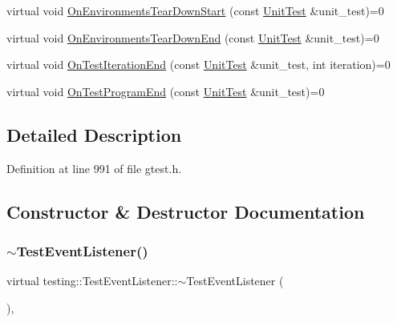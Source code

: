 \begin{DoxyCompactItemize}
\item 
virtual void \hyperlink{classtesting_1_1TestEventListener_a468b5e6701bcb86cb2c956caadbba5e4}{On\+Environments\+Tear\+Down\+Start} (const \hyperlink{classtesting_1_1UnitTest}{Unit\+Test} \&unit\+\_\+test)=0
\item 
virtual void \hyperlink{classtesting_1_1TestEventListener_a9ea04fa7f447865ba76df35e12ba2092}{On\+Environments\+Tear\+Down\+End} (const \hyperlink{classtesting_1_1UnitTest}{Unit\+Test} \&unit\+\_\+test)=0
\item 
virtual void \hyperlink{classtesting_1_1TestEventListener_a550fdb3e55726e4cefa09f5697941425}{On\+Test\+Iteration\+End} (const \hyperlink{classtesting_1_1UnitTest}{Unit\+Test} \&unit\+\_\+test, int iteration)=0
\item 
virtual void \hyperlink{classtesting_1_1TestEventListener_ad15b6246d94c268e233487a86463ef3d}{On\+Test\+Program\+End} (const \hyperlink{classtesting_1_1UnitTest}{Unit\+Test} \&unit\+\_\+test)=0
\end{DoxyCompactItemize}


\subsection{Detailed Description}


Definition at line 991 of file gtest.\+h.



\subsection{Constructor \& Destructor Documentation}
\mbox{\label{classtesting_1_1TestEventListener_a4512d19e7a108ec4926239ec1ea85d63}} 
\subsubsection{\texorpdfstring{$\sim$\+Test\+Event\+Listener()}{~TestEventListener()}}
{\footnotesize\ttfamily virtual testing\+::\+Test\+Event\+Listener\+::$\sim$\+Test\+Event\+Listener (\begin{DoxyParamCaption}{ }\end{DoxyParamCaption})\hspace{0.3cm}{\ttfamily [inline]}, {\ttfamily [virtual]}}



